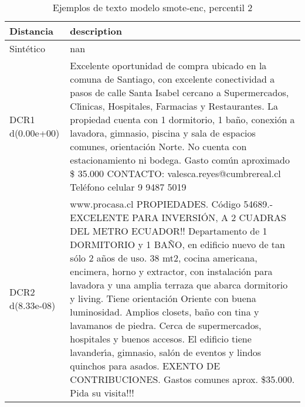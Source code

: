 \begin{table}[H]
\centering
\fontsize{10}{14}\selectfont
\caption{Ejemplos de texto modelo smote-enc, percentil 2}
\label{table-example-economicos-a-2-smote-enc-2p-text}
\begin{tabular}{|l|m{35em}|}
\hline
\rowcolor[gray]{0.8}
Distancia & description \\
\hline Sintético & nan \\
\hline DCR1 d(0.00e+00) & Excelente oportunidad de compra ubicado en la comuna de Santiago, con excelente conectividad a pasos de calle Santa Isabel cercano a Supermercados, Cl{\'\i}nicas, Hospitales, Farmacias y Restaurantes. La propiedad cuenta con 1 dormitorio, 1 ba\~no, conexi\'on a lavadora, gimnasio, piscina y sala de espacios comunes, orientaci\'on Norte.
 No cuenta con estacionamiento ni bodega. Gasto com\'un aproximado \$ 35.000 CONTACTO: valesca.reyes@cumbrereal.cl Tel\'efono celular 9 9487 5019 \\
\hline DCR2 d(8.33e-08) & www.procasa.cl    PROPIEDADES. C\'odigo 54689.- EXCELENTE PARA INVERSI\'ON, A 2 CUADRAS DEL METRO ECUADOR!! Departamento de 1 DORMITORIO y 1 BA\~NO, en edificio nuevo de tan s\'olo 2 a\~nos de uso. 38 mt2, cocina americana, encimera, horno y extractor, con instalaci\'on para lavadora y una amplia terraza que abarca dormitorio y living. Tiene orientaci\'on Oriente con buena luminosidad. Amplios closets, ba\~no con tina y lavamanos de piedra. Cerca de supermercados, hospitales y buenos accesos. El edificio tiene lavander{\'\i}a, gimnasio, sal\'on de eventos y lindos quinchos para asados.   EXENTO DE CONTRIBUCIONES. Gastos comunes aprox. \$35.000.  Pida su visita!!! \\
\hline
\end{tabular}
\end{table}

